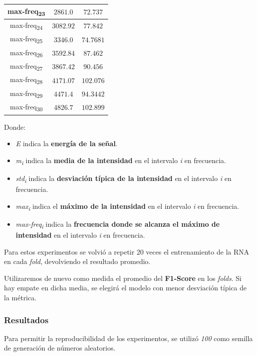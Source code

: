 \documentclass[12pt]{article}
\begin{document}
\begin{table}
\begin{tabular}{||c c c||}
			\hline
			max-freq\textsubscript{23} & $2861.0$ & $72.737$ \\
			\hline
			max-freq\textsubscript{24} & $3082.92$ & $77.842$ \\
			\hline
			max-freq\textsubscript{25} & $3346.0$ & $74.7681$ \\
			\hline
			max-freq\textsubscript{26} & $3592.84$ & $87.462$ \\
			\hline
			max-freq\textsubscript{27} & $3867.42$ & $90.456$ \\
			\hline
			max-freq\textsubscript{28} & $4171.07$ & $102.076$ \\
			\hline
			max-freq\textsubscript{29} & $4471.4$ & $94.3442$ \\
			\hline
			max-freq\textsubscript{30} & $4826.7$ & $102.899$ \\
			\hline
		\end{tabular}
	\label{Tab:Features_4_4}
\end{table}

\newpage
\hphantom{skip}

Donde:
\begin{itemize}
	\item \textit{E} indica la \textbf{energía de la señal}.
	\item \textit{m\textsubscript{i}} indica la \textbf{media de la intensidad} en el intervalo \textit{i} en frecuencia.
	\item \textit{std\textsubscript{i}} indica la \textbf{desviación típica de la intensidad} en el intervalo \textit{i} en frecuencia.
	\item \textit{max\textsubscript{i}} indica el \textbf{máximo de la intensidad} en el intervalo \textit{i} en frecuencia.
	\item \textit{max-freq\textsubscript{i}} indica la \textbf{frecuencia donde se alcanza el máximo de intensidad} en el intervalo \textit{i} en frecuencia.
\end{itemize}

\bigskip
Para estos experimentos se volvió a repetir 20 veces el entrenamiento de la RNA en cada \textit{fold}, devolviendo el resultado promedio.

\bigskip
Utilizaremos de nuevo como medida el promedio del \textbf{F1-Score} en los \textit{folds}. Si hay empate en dicha media, se elegirá el modelo con menor
desviación típica de la métrica.

\subsubsection{Resultados}
Para permitir la reproducibilidad de los experimentos, se utilizó \textit{100} como semilla de generación de números
aleatorios.
\end{document}
